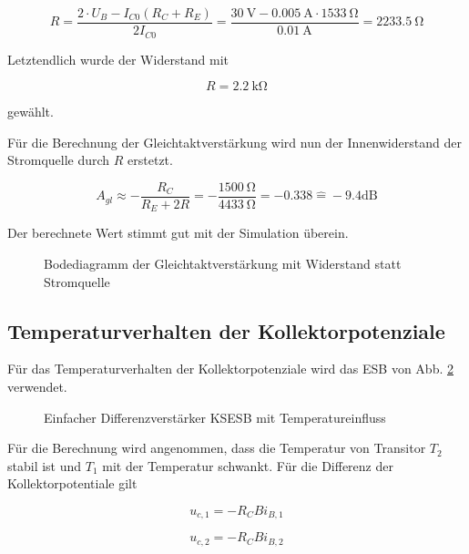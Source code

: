 \begin{equation}
    R = \frac{2\cdot U_B - I_{C0} (R_C + R_E)}{2 I_{C0} } = \frac{\SI{30}{\volt} - \SI{0.005}{\ampere} \cdot \SI{1533}{\ohm}}{\SI{0,01}{\ampere}} = \SI{2233,5}{\ohm} 
\end{equation}

Letztendlich wurde der Widerstand mit

\begin{equation}
    R = \SI{2.2}{\kilo\ohm}
\end{equation}

gewählt.

Für die Berechnung der Gleichtaktverstärkung wird nun der Innenwiderstand der Stromquelle durch $R$ erstetzt.

\begin{equation}
    A_{gl} \approx -\frac{R_C}{R_E + 2R} = -\frac{\SI{1500}{\ohm}}{\SI{4433}{\ohm}} = -0.338 \hat{ = } -9.4 \text{dB}
\end{equation}

Der berechnete Wert stimmt gut mit der Simulation überein.

\begin{figure}[H]
	\centering \small
	\scalebox{0.9}{}
	\caption{Bodediagramm der Gleichtaktverstärkung mit Widerstand statt Stromquelle}
	\label{fig_Kap5_06:Bode}
\end{figure}

\subsection{Temperaturverhalten der Kollektorpotenziale}
Für das Temperaturverhalten der Kollektorpotenziale wird das ESB von Abb. \ref{fig_Kap5_07:Temp} verwendet.

\begin{figure}[H]
	\centering
	\def\svgwidth{0.9\textwidth}
	
	\caption{Einfacher Differenzverstärker KSESB mit Temperatureinfluss} 
	\label{fig_Kap5_07:Temp} 
\end{figure}

Für die Berechnung wird angenommen, dass die Temperatur von Transitor $T_2$ stabil ist und $T_1$ mit der Temperatur schwankt.  Für die Differenz der Kollektorpotentiale gilt

\begin{equation}
    u_{c,1} = -R_C B i_{B,1}
\end{equation}

\begin{equation}
    u_{c,2} = -R_C B i_{B,2}
\end{equation}

